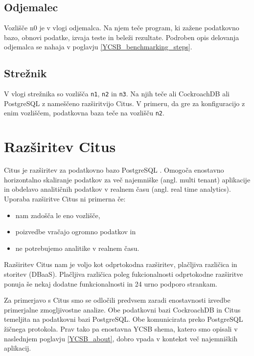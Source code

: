 \documentclass[a4paper, 12pt]{book}
\begin{document}
\subsection{Odjemalec}
Vozlišče n0 je v vlogi odjemalca. Na njem teče program, ki zažene podatkovno bazo, obnovi podatke, izvaja teste in beleži rezultate. Podroben opis delovanja odjemalca se nahaja v poglavju \ref{YCSB_benchmarking_steps}.

\subsection{Strežnik}
V vlogi strežnika so vozlišča \texttt{n1}, \texttt{n2} in \texttt{n3}. Na njih teče ali CockroachDB ali PostgreSQL z nameščeno razširitvijo Citus. V primeru, da gre za konfiguracijo z enim vozliščem, podatkovna baza teče na vozlišču \texttt{n2}.

\section{Razširitev Citus}
\label{benchmarking/citus}
Citus je razširitev za podatkovno bazo PostgreSQL \cite{citus}. Omogoča enostavno horizontalno skaliranje podatkov za več najemniške (angl. multi tenant) aplikacije in obdelavo analitičnih podatkov v realnem času (angl. real time analytics). Uporaba razširitve Citus ni primerna če:
\begin{itemize}
    \item nam zadošča le eno vozlišče,
    \item poizvedbe vračajo ogromno podatkov in
    \item ne potrebujemo analitike v realnem času.
\end{itemize}

Razširitev Citus nam je voljo kot odprtokodna razširitev, plačljiva različi\-ca in storitev (DBaaS). Plačljiva različica poleg fukcionalnosti odprtokodne raz\-širitve ponuja še nekaj dodatne funkcionalnosti in 24 urno podporo strankam.

Za primerjavo s Citus smo se odločili predvsem zaradi enostavnosti izvedbe primerjalne zmogljivostne analize. Obe podatkovni bazi CockroachDB in Citus temeljita na podatkovni bazi PostgreSQL. Obe komunicirata preko PostgreSQL žičnega protokola. Prav tako pa enostavna YCSB shema, katero smo opisali v naslednjem poglavju \ref{YCSB_about}, dobro vpada v kontekst več najemniških aplikacij.
\end{document}
